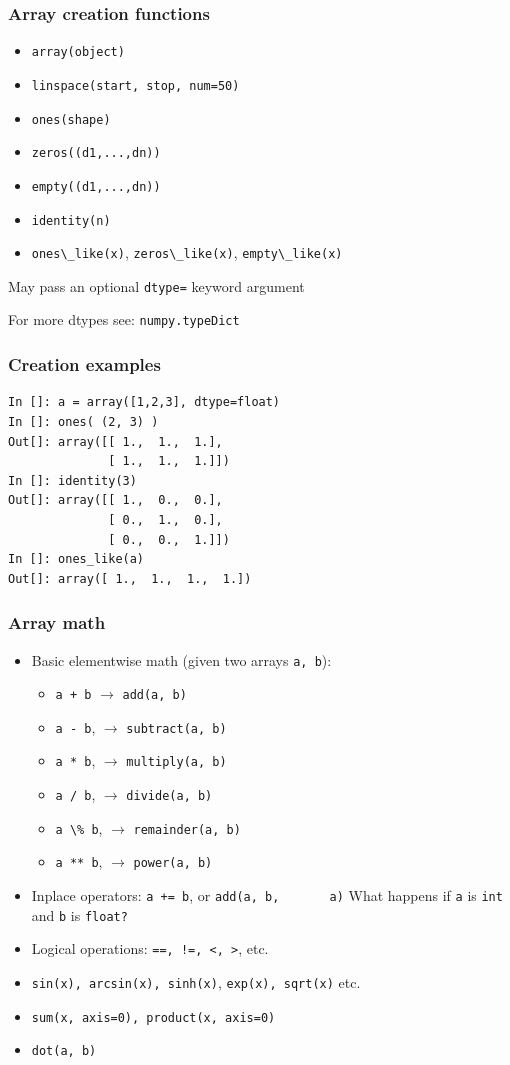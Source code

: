 \documentclass[14pt,compress]{beamer}
\newcommand{\typ}[1]{\lstinline{#1}}
\begin{document}
\begin{frame}[fragile]
  \frametitle{Array creation functions}
  \begin{itemize}
  \item \typ{array(object)}
  \item \typ{linspace(start, stop, num=50)}
  \item \typ{ones(shape)}
  \item \typ{zeros((d1,...,dn))}
  \item \typ{empty((d1,...,dn))}
  \item \typ{identity(n)}
  \item \typ{ones\_like(x)}, \typ{zeros\_like(x)}, \typ{empty\_like(x)}
  \end{itemize}
  May pass an optional \typ{dtype=} keyword argument

  For more dtypes see: \typ{numpy.typeDict}
\end{frame}

\begin{frame}[fragile]
  \frametitle{Creation examples}
  \vspace*{-0.25in}
\begin{lstlisting}
In []: a = array([1,2,3], dtype=float)
In []: ones( (2, 3) )
Out[]: array([[ 1.,  1.,  1.],
              [ 1.,  1.,  1.]])
In []: identity(3)
Out[]: array([[ 1.,  0.,  0.],
              [ 0.,  1.,  0.],
              [ 0.,  0.,  1.]])
In []: ones_like(a)
Out[]: array([ 1.,  1.,  1.,  1.])
\end{lstlisting}
\end{frame}

\begin{frame}[fragile]
  \frametitle{Array math}
  \begin{itemize}
  \item Basic \alert{elementwise} math (given two arrays \typ{a, b}):
    \begin{itemize}
        \item \typ{a + b} $\rightarrow$ \typ{add(a, b)}
        \item \typ{a - b}, $\rightarrow$ \typ{subtract(a, b)}
        \item \typ{a * b}, $\rightarrow$ \typ{multiply(a, b)}
        \item \typ{a / b}, $\rightarrow$ \typ{divide(a, b)}
        \item \typ{a \% b}, $\rightarrow$ \typ{remainder(a, b)}
        \item \typ{a ** b}, $\rightarrow$ \typ{power(a, b)}
    \end{itemize}
  \item Inplace operators: \typ{a += b}, or \typ{add(a, b,
      a)}
    \alert{What happens if \typ{a} is \typ{int} and \typ{b} is \typ{float?}}
  \item Logical operations: \typ{==, !=, <, >}, etc.
  \item \typ{sin(x), arcsin(x), sinh(x)},
      \typ{exp(x), sqrt(x)} etc.
  \item \typ{sum(x, axis=0), product(x, axis=0)}
  \item \typ{dot(a, b)}
  \end{itemize}
\end{frame}
\end{document}
